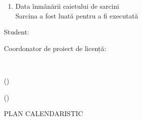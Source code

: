 \begin{titlepage}
\begin{titlepagefont}
\begin{enumerate}[label=\arabic*.]
            
            \item Data înmânării caietului de sarcini \emph{\taskstart} \\
            Sarcina a fost luată pentru a fi executată \emph{\taskstart} \\
        
        \end{enumerate}
        
        \bigskip
        
        \begin{minipage}{0.35\textwidth}
            \raggedleft
            {Student: \par}
            \bigskip
            {Coordonator de proiect de licență: \par}
        \end{minipage}
        ~
        \begin{minipage}{0.35\textwidth}
            \raggedright
            {\emph{\authorname} (\dotfill) \par}
            \bigskip
            {\emph{\supername} (\dotfill) \par}
        \end{minipage}
        
        \vfill
        
        \bigskip
        {PLAN CALENDARISTIC \par}
        \bigskip
        
        \noindent
        \begin{tabular}{ |p{}|p{}|p{}|p{}| } \hline
        

\end{tabular}
\end{titlepagefont}
\end{titlepage}
